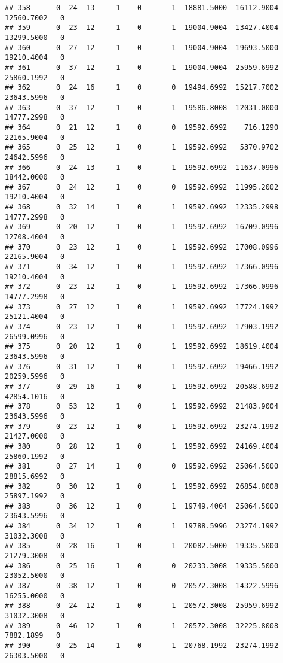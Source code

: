 \documentclass[
]{article}
\begin{document}
\begin{enumerate}
\begin{verbatim}
## 358      0  24  13     1    0       1  18881.5000  16112.9004  12560.7002   0
## 359      0  23  12     1    0       1  19004.9004  13427.4004  13299.5000   0
## 360      0  27  12     1    0       1  19004.9004  19693.5000  19210.4004   0
## 361      0  37  12     1    0       1  19004.9004  25959.6992  25860.1992   0
## 362      0  24  16     1    0       0  19494.6992  15217.7002  23643.5996   0
## 363      0  37  12     1    0       1  19586.8008  12031.0000  14777.2998   0
## 364      0  21  12     1    0       0  19592.6992    716.1290  22165.9004   0
## 365      0  25  12     1    0       1  19592.6992   5370.9702  24642.5996   0
## 366      0  24  13     1    0       1  19592.6992  11637.0996  18442.0000   0
## 367      0  24  12     1    0       0  19592.6992  11995.2002  19210.4004   0
## 368      0  32  14     1    0       1  19592.6992  12335.2998  14777.2998   0
## 369      0  20  12     1    0       1  19592.6992  16709.0996  12708.4004   0
## 370      0  23  12     1    0       1  19592.6992  17008.0996  22165.9004   0
## 371      0  34  12     1    0       1  19592.6992  17366.0996  19210.4004   0
## 372      0  23  12     1    0       1  19592.6992  17366.0996  14777.2998   0
## 373      0  27  12     1    0       1  19592.6992  17724.1992  25121.4004   0
## 374      0  23  12     1    0       1  19592.6992  17903.1992  26599.0996   0
## 375      0  20  12     1    0       1  19592.6992  18619.4004  23643.5996   0
## 376      0  31  12     1    0       1  19592.6992  19466.1992  20259.5996   0
## 377      0  29  16     1    0       1  19592.6992  20588.6992  42854.1016   0
## 378      0  53  12     1    0       1  19592.6992  21483.9004  23643.5996   0
## 379      0  23  12     1    0       1  19592.6992  23274.1992  21427.0000   0
## 380      0  28  12     1    0       1  19592.6992  24169.4004  25860.1992   0
## 381      0  27  14     1    0       0  19592.6992  25064.5000  28815.6992   0
## 382      0  30  12     1    0       1  19592.6992  26854.8008  25897.1992   0
## 383      0  36  12     1    0       1  19749.4004  25064.5000  23643.5996   0
## 384      0  34  12     1    0       1  19788.5996  23274.1992  31032.3008   0
## 385      0  28  16     1    0       1  20082.5000  19335.5000  21279.3008   0
## 386      0  25  16     1    0       0  20233.3008  19335.5000  23052.5000   0
## 387      0  38  12     1    0       0  20572.3008  14322.5996  16255.0000   0
## 388      0  24  12     1    0       1  20572.3008  25959.6992  31032.3008   0
## 389      0  46  12     1    0       1  20572.3008  32225.8008   7882.1899   0
## 390      0  25  14     1    0       1  20768.1992  23274.1992  26303.5000   0

\end{verbatim}
\end{enumerate}
\end{document}
